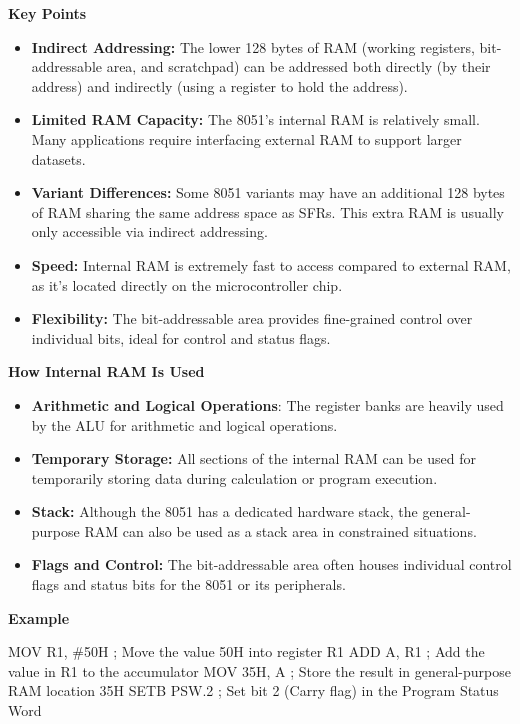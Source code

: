 \documentclass[
]{article}
\newenvironment{Shaded}{}{}
\newcommand{\NormalTok}[1]{#1}
\begin{document}
\textbf{Key Points}

\begin{itemize}
\item
  \textbf{Indirect Addressing:} The lower 128 bytes of RAM (working
  registers, bit-addressable area, and scratchpad) can be addressed both
  directly (by their address) and indirectly (using a register to hold
  the address).
\item
  \textbf{Limited RAM Capacity:} The 8051's internal RAM is relatively
  small. Many applications require interfacing external RAM to support
  larger datasets.
\item
  \textbf{Variant Differences:} Some 8051 variants may have an
  additional 128 bytes of RAM sharing the same address space as SFRs.
  This extra RAM is usually only accessible via indirect addressing.
\item
  \textbf{Speed:} Internal RAM is extremely fast to access compared to
  external RAM, as it's located directly on the microcontroller chip.
\item
  \textbf{Flexibility:} The bit-addressable area provides fine-grained
  control over individual bits, ideal for control and status flags.
\end{itemize}

\textbf{How Internal RAM Is Used}

\begin{itemize}
\item
  \textbf{Arithmetic and Logical Operations}: The register banks are
  heavily used by the ALU for arithmetic and logical operations.
\item
  \textbf{Temporary Storage:} All sections of the internal RAM can be
  used for temporarily storing data during calculation or program
  execution.
\item
  \textbf{Stack:} Although the 8051 has a dedicated hardware stack, the
  general-purpose RAM can also be used as a stack area in constrained
  situations.
\item
  \textbf{Flags and Control:} The bit-addressable area often houses
  individual control flags and status bits for the 8051 or its
  peripherals.
\end{itemize}

\textbf{Example}

\begin{Shaded}
\begin{Highlighting}[]
\NormalTok{MOV R1, \#50H  ; Move the value 50H into register R1}
\NormalTok{ADD A, R1     ; Add the value in R1 to the accumulator}
\NormalTok{MOV 35H, A    ; Store the result in general{-}purpose RAM location 35H}
\NormalTok{SETB PSW.2    ; Set bit 2 (Carry flag) in the Program Status Word}
\end{Highlighting}
\end{Shaded}
\end{document}
